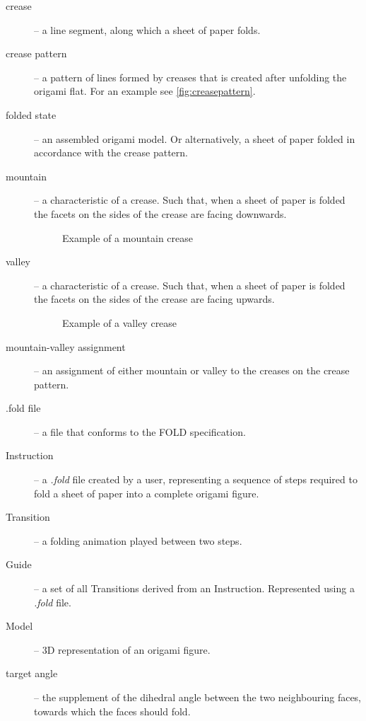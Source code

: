 \begin{description}
	\item[crease] -- a line segment, along which a sheet of paper folds.
	\item[crease pattern] \label{dictionary:crease-pattern} -- a pattern of lines formed by creases that is created after unfolding the origami flat. For an example see \autoref{fig:creasepattern}.
	\item[folded state] \label{dictionary:folded-state} -- an assembled origami model. Or alternatively, a sheet of paper folded in accordance with the crease pattern.
	\item[mountain] -- a characteristic of a crease. Such that, when a sheet of paper is folded the facets on the sides of the crease are facing downwards.
					\begin{figure}[H]
						\caption{Example of a mountain crease}
						\centering
					\end{figure}
	\item[valley] -- a characteristic of a crease. Such that, when a sheet of paper is folded the facets on the sides of the crease are facing upwards.
					\begin{figure}[H]
						\caption{Example of a valley crease}
						\centering
					\end{figure}
	\item[mountain-valley assignment] -- an assignment of either mountain or valley to the creases on the crease pattern.
	\item[.fold file] -- a file that conforms to the FOLD \cite{fold:paper} specification.
	\item[Instruction] -- a \textit{.fold} file created by a user, representing a sequence of steps required to
		fold a sheet of paper into a complete origami figure.
	\item[Transition] -- a folding animation played between two steps.
	\item[Guide] -- a set of all Transitions derived from an Instruction. Represented using a \textit{.fold} file.
	\item[Model] -- 3D representation of an origami figure. 
	\item[target angle] -- the supplement of the dihedral angle between the two neighbouring faces,
		towards which the faces should fold.
\end{description}

